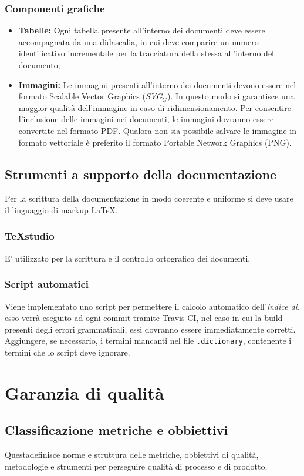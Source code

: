 \subsubsection{Componenti grafiche}
	\begin{itemize}
	\item \textbf{Tabelle:} 
	Ogni tabella presente all'interno dei documenti deve essere accompagnata da una didascalia,	in cui deve comparire un numero identificativo incrementale per la tracciatura della stessa all'interno del documento;
	\item \textbf{Immagini:}
	Le immagini presenti all'interno dei documenti devono essere nel formato Scalable Vector Graphics (\textit{SVG$_{G}$}). In questo modo si garantisce una maggior qualità dell'immagine in caso di ridimensionamento. Per consentire l’inclusione delle immagini nei documenti,
	le immagini dovranno essere convertite nel formato PDF. Qualora non sia possibile
	salvare le immagine in formato vettoriale è preferito il formato Portable Network
	Graphics (PNG).
	\end{itemize}
\subsection{Strumenti a supporto della documentazione}
Per la scrittura della documentazione in modo coerente e uniforme si deve usare il linguaggio di markup \LaTeX.
\subsubsection{TeXstudio}
E' utilizzato per la scrittura e il controllo ortografico dei documenti.
\subsubsection{Script automatici}
Viene implementato uno script per permettere il calcolo automatico dell'\textit{indice di}, esso verrà eseguito ad ogni commit tramite Travis-CI, nel caso in cui la build presenti degli errori grammaticali, essi dovranno essere immediatamente corretti.\\
Aggiungere, se necessario, i termini mancanti nel file \texttt{.dictionary}, contenente i termini che lo script deve ignorare.

\section{Garanzia di qualità}
\subsection{Classificazione metriche e obbiettivi}
Questadefinisce norme e struttura delle metriche, obbiettivi di qualità, metodologie e strumenti per perseguire qualità di processo e di prodotto. 
